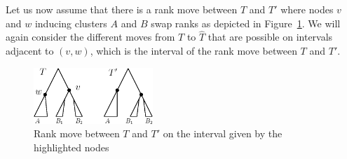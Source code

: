 \documentclass{amsart}
\begin{document}
Let us now assume that there is a rank move between $T$ and $T'$ where nodes $v$ and $w$ inducing clusters $A$ and $B$ swap ranks as depicted in Figure~\ref{fig:thm_fp_rank1}.
We will again consider the different moves from $T$ to $\hat T$ that are possible on intervals adjacent to $(v,w)$, which is the interval of the rank move between $T$ and $T'$.


\begin{figure}[!hbt]
\centering
\includegraphics[width=0.4\textwidth]{thm_fp_rank1}
\vspace{12pt}
\caption{Rank move between $T$ and $T'$ on the interval given by the highlighted nodes}
\label{fig:thm_fp_rank1}
\end{figure}
\end{document}
